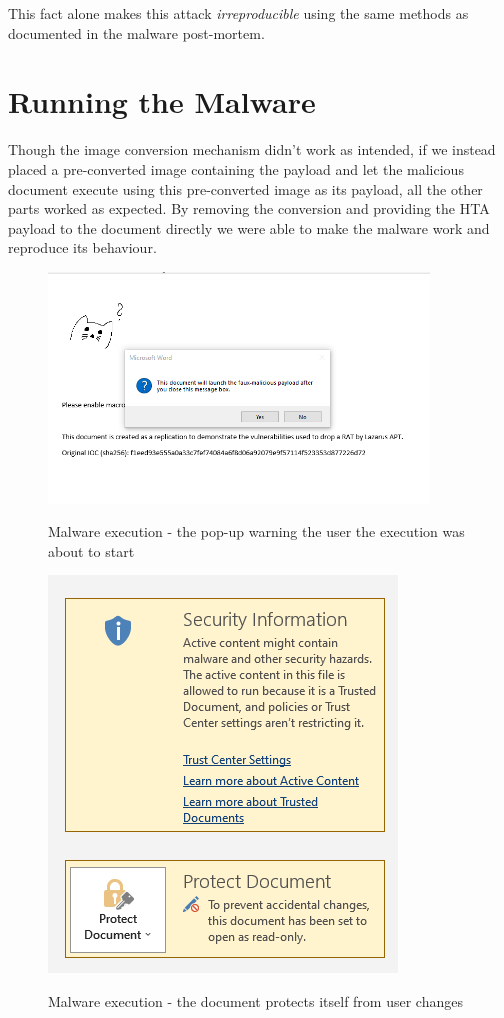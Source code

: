 This fact alone makes this attack \emph{irreproducible} using the same methods as documented in the malware post-mortem.

\section{Running the Malware}
Though the image conversion mechanism didn't work as intended, if we instead placed a pre-converted image containing the
payload and let the malicious document execute using this pre-converted image as its payload, all the other parts worked
as expected. By removing the conversion and providing the \acrshort{HTA} payload to the document directly we were able
to make the malware work and reproduce its behaviour. 

\begin{figure}[H]
  \centering
  \includegraphics[width=0.9\textwidth]{figures/macro_popup.png}
  \label{malware-msgbox}
  \caption{Malware execution - the pop-up warning the user the execution was about to start}
\end{figure}

\begin{figure}[H]
  \centering
  \includegraphics[scale=0.6]{figures/document_protected.png}
  \label{malware-doc-protected}
  \caption{Malware execution - the document protects itself from user changes}
\end{figure}

